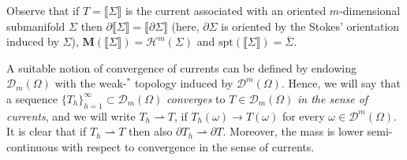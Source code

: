 \documentclass[a4paper,11pt,reqno]{amsart}
\theoremstyle{definition}
\numberwithin{equation}{section}
\numberwithin{subsection}{section}
\newcommand{\D}{\mathcal{D}}
\newcommand{\M}{\mathbf{M}}
\newcommand{\spt}{\mathrm{spt}}
\newcommand{\Ha}{\mathcal{H}}
\newcommand{\weakto}{\rightharpoonup}
\begin{document}
Observe that if $T = \llbracket \Sigma \rrbracket$ is the current associated with an oriented $m$-dimensional submanifold $\Sigma$ then $\partial \llbracket \Sigma \rrbracket = \llbracket \partial \Sigma \rrbracket$ (here, $\partial \Sigma$ is oriented by the Stokes' orientation induced by $\Sigma$), $\M(\llbracket \Sigma \rrbracket) = \Ha^m(\Sigma)$ and $\spt(\llbracket \Sigma \rrbracket) = \overline{\Sigma}$. 

A suitable notion of convergence of currents can be defined by endowing $\D_{m}(\Omega)$ with the weak-$^{*}$ topology induced by $\D^{m}(\Omega)$. Hence, we will say that a sequence $\{T_{h}\}_{h=1}^{\infty} \subset \D_{m}(\Omega)$ \emph{converges} to $T \in \D_{m}(\Omega)$ \emph{in the sense of currents}, and we will write $T_{h} \weakto T$, if $T_{h}(\omega) \to T(\omega)$ for every $\omega \in \D^{m}(\Omega)$. It is clear that if $T_{h} \weakto T$ then also $\partial T_{h} \weakto \partial T$. Moreover, the mass is lower semi-continuous with respect to convergence in the sense of currents.
\end{document}
